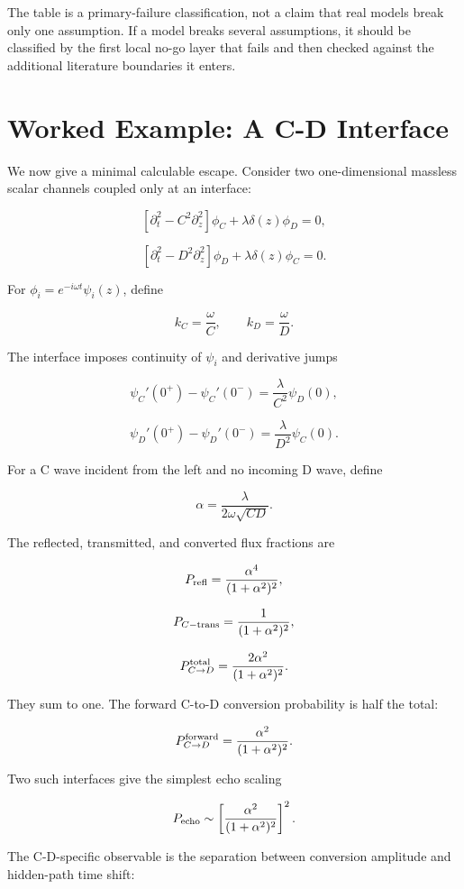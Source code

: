 \documentclass[11pt]{article}
\begin{document}
The table is a primary-failure classification, not a claim that real models break only one assumption. If a model breaks several assumptions, it should be classified by the first local no-go layer that fails and then checked against the additional literature boundaries it enters.


\section{Worked Example: A C-D Interface}


We now give a minimal calculable escape. Consider two one-dimensional massless scalar channels coupled only at an interface:


\[
\left[\partial_t^2-C^2\partial_z^2\right]\phi_C+\lambda\delta(z)\phi_D=0,
\]


\[
\left[\partial_t^2-D^2\partial_z^2\right]\phi_D+\lambda\delta(z)\phi_C=0.
\]


For \(\phi_i=e^{-i\omega t}\psi_i(z)\), define


\[
k_C=\frac{\omega}{C},\qquad k_D=\frac{\omega}{D}.
\]


The interface imposes continuity of \(\psi_i\) and derivative jumps


\[
\psi_C'(0^+)-\psi_C'(0^-)= \frac{\lambda}{C^2}\psi_D(0),
\]


\[
\psi_D'(0^+)-\psi_D'(0^-)= \frac{\lambda}{D^2}\psi_C(0).
\]


For a C wave incident from the left and no incoming D wave, define


\[
\alpha=\frac{\lambda}{2\omega\sqrt{CD}} .
\]


The reflected, transmitted, and converted flux fractions are


\[
P_{\rm refl}=\frac{\alpha^4}{(1+\alpha^2)^2},
\]


\[
P_{C{\rm -trans}}=\frac{1}{(1+\alpha^2)^2},
\]


\[
P_{C\to D}^{\rm total}=\frac{2\alpha^2}{(1+\alpha^2)^2}.
\]


They sum to one. The forward C-to-D conversion probability is half the total:


\[
P_{C\to D}^{\rm forward}=\frac{\alpha^2}{(1+\alpha^2)^2}.
\]


Two such interfaces give the simplest echo scaling


\[
P_{\rm echo}\sim
\left[
\frac{\alpha^2}{(1+\alpha^2)^2}
\right]^2.
\]


The C-D-specific observable is the separation between conversion amplitude and hidden-path time shift:
\end{document}
